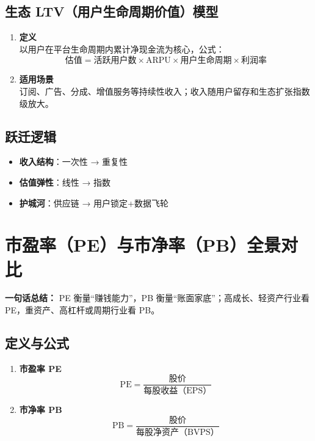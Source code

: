 \subsection{生态 LTV（用户生命周期价值）模型}
\begin{enumerate}[leftmargin=*, nosep]
    \item \textbf{定义}  \\
    以用户在平台生命周期内累计净现金流为核心，公式：  
    \[
    \text{估值} = \text{活跃用户数} \times \text{ARPU} \times \text{用户生命周期} \times \text{利润率}
    \]
    \item \textbf{适用场景}  \\
    订阅、广告、分成、增值服务等持续性收入；收入随用户留存和生态扩张指数级放大。
\end{enumerate}

\subsection{跃迁逻辑}
\begin{itemize}[leftmargin=*, nosep]
    \item \textbf{收入结构}：一次性 → 重复性  
    \item \textbf{估值弹性}：线性 → 指数  
    \item \textbf{护城河}：供应链 → 用户锁定+数据飞轮  
\end{itemize}

\section{市盈率（PE）与市净率（PB）全景对比}
\textbf{一句话总结：}  
PE 衡量“赚钱能力”，PB 衡量“账面家底”；高成长、轻资产行业看 PE，重资产、高杠杆或周期行业看 PB。

\subsection{定义与公式}
\begin{enumerate}[leftmargin=*, nosep]
    \item \textbf{市盈率 PE}  
    {\color{red}
    \[
    \text{PE} = \frac{\text{股价}}{\text{每股收益（EPS）}}
    \]
    }
    \item \textbf{市净率 PB}  
    {\color{red}
    \[
    \text{PB} = \frac{\text{股价}}{\text{每股净资产（BVPS）}}
    \]
    }
\end{enumerate}

